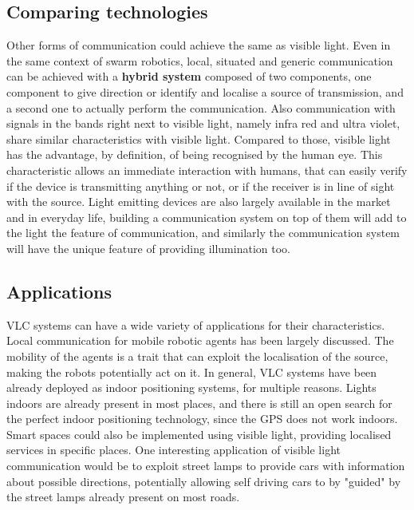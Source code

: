 \subsection{Comparing technologies}
Other forms of communication could achieve the same as visible light.
Even in the same context of swarm robotics, local, situated and generic communication can be achieved with a \textbf{hybrid system} composed of two components, one component to give direction or identify and localise a source of transmission, and a second one to actually perform the communication.
Also communication with signals in the bands right next to visible light, namely infra red and ultra violet, share similar characteristics with visible light.
Compared to those, visible light has the advantage, by definition, of being recognised by the human eye.
This characteristic allows an immediate interaction with humans, that can easily verify if the device is transmitting anything or not, or if the receiver is in line of sight with the source.
Light emitting devices are also largely available in the market and in everyday life, building a communication system on top of them will add to the light the feature of communication, and similarly the communication system will have the unique feature of providing illumination too.

\subsection{Applications}
VLC systems can have a wide variety of applications for their characteristics.
Local communication for mobile robotic agents has been largely discussed.
The mobility of the agents is a trait that can exploit the localisation of the source, making the robots potentially act on it.
In general, VLC systems have been already deployed as indoor positioning systems, for multiple reasons.
Lights indoors are already present in most places, and there is still an open search for the perfect indoor positioning technology, since the GPS does not work indoors.
Smart spaces could also be implemented using visible light, providing localised services in specific places.
One interesting application of visible light communication would be to exploit street lamps to provide cars with information about possible directions, potentially allowing self driving cars to by "guided" by the street lamps already present on most roads. 

